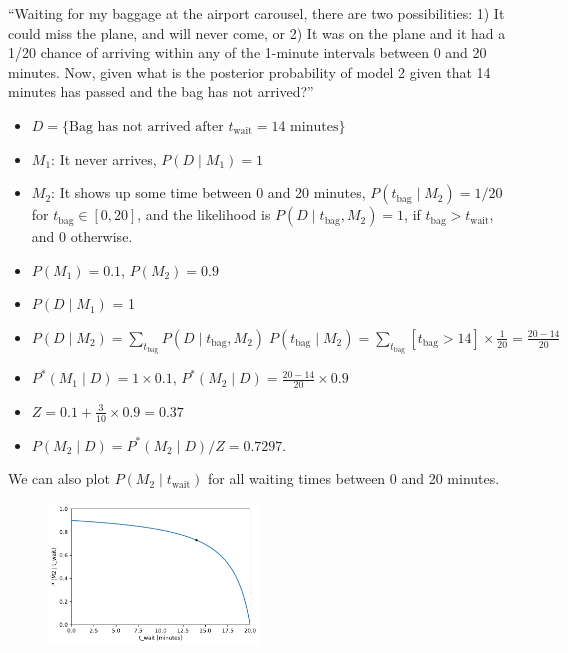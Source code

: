 ``Waiting for my baggage at the airport carousel, there are two possibilities: 1) It could miss the plane, and will never come, or 2) It was on the plane and it had a 1/20 chance of arriving within any of the 1-minute intervals between 0 and 20 minutes. Now, given what is the posterior probability of model 2 given that 14 minutes has passed and the bag has not arrived?''
\begin{itemize}
	\item $D = \{\text{Bag has not arrived after } t_\text{wait}=14 \text{ minutes}\}$
	\item $M_1$: It never arrives, $P(D\;|\;M_1) = 1$
	\item $M_2$: It shows up some time between 0 and 20 minutes, $P(t_\text{bag}\;|\;M_2) = 1/20$ for $t_\text{bag} \in [0, 20]$, and the likelihood is $P(D\;|\;t_\text{bag}, M_2) = 1$, if $t_\text{bag} > t_\text{wait}$, and 0 otherwise.
	\item $P(M_1) = 0.1$, \quad $P(M_2)= 0.9$
	\item $P(D\;|\;M_1)$ = 1
	\item $P(D\;|\;M_2) = \sum_{t_\text{bag}} P(D\;|\;t_\text{bag}, M_2) \;P(t_\text{bag}\;|\;M_2) = \sum_{t_\text{bag}} [t_\text{bag} > 14] \times\frac{1}{20} = \frac{20 - 14}{20}$
	\item $P^\ast(M_1\;|\;D) = 1 \times 0.1$, \quad $P^\ast(M_2\;|\;D) = \frac{20 - 14}{20}\times 0.9$
	\item $Z = 0.1 + \frac{3}{10}\times 0.9 = 0.37$
	\item $P(M_2\;|\;D) = P^\ast(M_2\;|\;D) / Z = 0.7297$.
\end{itemize}
We can also plot $P(M_2\;|\;t_\text{wait})$ for all waiting times between 0 and 20 minutes.
\begin{figure}[h]
	\centering
	\includegraphics[width=0.5\textwidth]{figs/Baggage_wait.pdf}
\end{figure}


